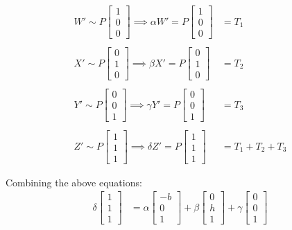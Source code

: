\documentclass[12pt, oneside]{article}
\begin{document}
\begin{align*}
    W' \sim P
    \begin{bmatrix} 1   \\ 0   \\ 0   \end{bmatrix} \implies 
    \alpha W' = P
    \begin{bmatrix} 1   \\ 0   \\ 0   \end{bmatrix}  &= T_1 \\ \\
    X' \sim P
    \begin{bmatrix} 0   \\ 1   \\ 0   \end{bmatrix} \implies 
    \beta X' = P
    \begin{bmatrix} 0   \\ 1   \\ 0   \end{bmatrix}  &= T_2 \\ \\
    Y' \sim P
    \begin{bmatrix} 0   \\ 0   \\ 1   \end{bmatrix} \implies 
    \gamma Y' = P
    \begin{bmatrix} 0   \\ 0   \\ 1   \end{bmatrix}   &= T_3 \\ \\
    Z' \sim P
    \begin{bmatrix} 1   \\ 1    \\ 1   \end{bmatrix} \implies 
    \delta Z' = P
    \begin{bmatrix} 1   \\ 1   \\ 1 \end{bmatrix}   &= T_1 + T_2 + T_3
\end{align*}
    
    Combining the above equations:
\begin{align*}
    \delta  \begin{bmatrix} 1   \\ 1   \\ 1   \end{bmatrix}  &= 
    \alpha \begin{bmatrix} -b   \\ 0   \\   1   \end{bmatrix} +
    \beta \begin{bmatrix} 0   \\ h   \\   1   \end{bmatrix} + 
    \gamma  \begin{bmatrix} 0  \\ 0 \\ 1  \end{bmatrix} 
\end{align*} 
  
\end{document}
